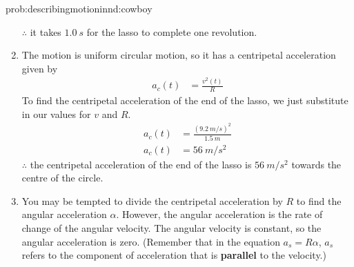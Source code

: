 \begin{solution}{prob:describingmotioninnd:cowboy}
\begin{enumerate}[label=\alph*)]
$\therefore$ it takes $\SI{1.0}{s}$ for the lasso to complete one revolution.
\item The motion is uniform circular motion, so it has a centripetal acceleration given by
\begin{align*}
a_c(t)&=\frac{v^2(t)}{R}
\end{align*}
To find the centripetal acceleration of the end of the lasso, we just substitute in our values for $v$ and $R$.
\begin{align*}
a_c(t)&=\frac{(\SI{9.2}{m/s})^2}{\SI{1.5}{m}}\\
a_c(t)&=\SI{56}{m/s^2}
\end{align*}
$\therefore$ the centripetal acceleration of the end of the lasso is $\SI{56}{m/s^2}$ towards the centre of the circle. 
\item You may be tempted to divide the centripetal acceleration by $R$ to find the angular acceleration $\alpha$. However, the angular acceleration is the rate of change of the angular velocity. The angular velocity is constant, so the angular acceleration is zero. (Remember that in the equation $a_s=R\alpha$, $a_s$ refers to the component of acceleration that is \textbf{parallel} to the velocity.)
\end{enumerate}
\end{solution}